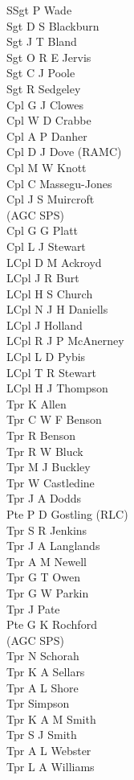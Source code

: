 \begin{multicols}{3}
\small
\noindent
  SSgt P Wade \\
  Sgt D S Blackburn \\
  Sgt J T Bland \\
  Sgt O R E Jervis \\
  Sgt C J Poole \\
  Sgt R Sedgeley \\
  Cpl G J Clowes \\
  Cpl W D Crabbe \\
  Cpl A P Danher \\
  Cpl D J Dove (RAMC) \\
  Cpl M W Knott \\
  Cpl C Massegu-Jones \\
  Cpl J S Muircroft \\ \indent (AGC SPS) \\
  Cpl G G Platt \\
  Cpl L J Stewart \\
  LCpl D M Ackroyd \\
  LCpl J R Burt \\
  LCpl H S Church \\
  LCpl N J H Daniells \\
  LCpl J Holland \\
  LCpl R J P McAnerney \\
  LCpl L D Pybis \\
  LCpl T R Stewart \\
  LCpl H J Thompson \\
  Tpr K Allen \\
  Tpr C W F Benson \\
  Tpr R Benson \\
  Tpr R W Bluck \\
  Tpr M J Buckley \\
  Tpr W Castledine \\
  Tpr J A Dodds \\
  Pte P D Gostling (RLC) \\
  Tpr S R Jenkins \\
  Tpr J A Langlands \\
  Tpr A M Newell \\
  Tpr G T Owen \\
  Tpr G W Parkin \\
  Tpr J Pate \\
  Pte G K Rochford \\ \indent (AGC SPS) \\
  Tpr N Schorah \\
  Tpr K A Sellars \\
  Tpr A L Shore \\
  Tpr Simpson \\
  Tpr K A M Smith \\
  Tpr S J Smith \\
  Tpr A L Webster \\
  Tpr L A Williams
\end{multicols}

\pagebreak
